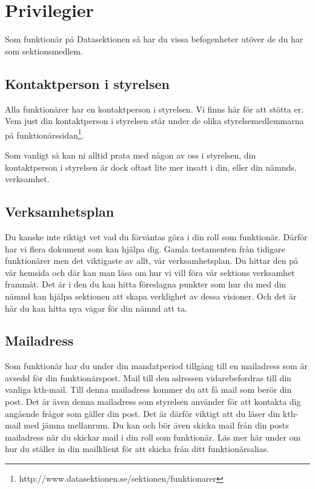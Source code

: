 \documentclass[a4paper,11pt]{article}
\begin{document}
\section{Privilegier}
Som funktionär på Datasektionen så har du vissa befogenheter utöver de du har som sektionsmedlem.

\subsection{Kontaktperson i styrelsen}
Alla funktionärer har en kontaktperson i styrelsen. Vi finns här för att stötta er. Vem just din kontaktperson i styrelsen står under de olika styrelsemedlemmarna på funktionärssidan\footnote{http://www.datasektionen.se/sektionen/funktionarer}.

Som vanligt så kan ni alltid prata med någon av oss i styrelsen, din kontaktperson i styrelsen är dock oftast lite mer insatt i din, eller din nämnds, verksamhet.

\subsection{Verksamhetsplan}
Du kanske inte riktigt vet vad du förväntas göra i din roll som funktionär. Därför har vi flera dokument som kan hjälpa dig. Gamla testamenten från tidigare funktionärer men det viktigaste av allt, vår verksamhetsplan. Du hittar den på vår hemsida och där kan man läsa om hur vi vill föra vår sektions verksamhet frammåt. Det är i den du kan hitta föreslagna punkter som hur du med din nämnd kan hjälpa sektionen att skapa verklighet av dessa visioner. Och det är här du kan hitta nya vägar för din nämnd att ta.

\subsection{Mailadress}
Som funktionär har du under din mandatperiod tillgång till en mailadress som är avsedd för din funktionärspost. Mail till den adressen vidarebefordras till din vanliga kth-mail. Till denna mailadress kommer du att få mail som berör din post. Det är även denna mailadress som styrelsen använder för att kontakta dig angående frågor som gäller din post. Det är därför viktigt att du läser din kth-mail med jämna mellanrum. Du kan och bör även skicka mail från din posts mailadress när du skickar mail i din roll som funktionär. Läs mer här under om hur du ställer in din mailklient för att skicka från ditt funktionärsalias.
\end{document}
